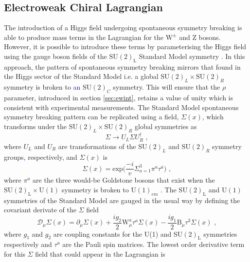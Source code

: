 \subsection{Electroweak Chiral Lagrangian}
\label{sec:ewchiral}
The introduction of a Higgs field undergoing spontaneous symmetry breaking is able to produce mass terms in the Lagrangian for the $\text{W}^{\pm}$ and Z bosons.  However, it is possible to introduce these terms by parameterising the Higgs field using the gauge boson fields of the $\text{SU}(2)_{\text{L}}$ Standard Model symmetry \cite{Herrero:1994tj}.  In this approach, the pattern of spontaneous symmetry breaking mirrors that found in the Higgs sector of the Standard Model i.e. a global $\text{SU}(2)_{L} \times \text{SU}(2)_{R}$ symmetry is broken to \textcolor{blue}{an} $\text{SU}(2)_{C}$ symmetry.  This will ensure that the $\rho$ parameter, introduced in section \ref{sec:ewint}, retains a value of unity which is consistent with experimental measurements.  The Standard Model spontaneous symmetry breaking pattern can be replicated using a field, $\Sigma(x)$, which transforms under the $\text{SU}(2)_{L} \times \text{SU}(2)_{R}$ global symmetries as
%
\begin{equation}
\Sigma \rightarrow U_{L} \Sigma U_{R}^{\dagger} \text{ ,}
\end{equation}
%
\noindent where $U_{L}$ and $U_{R}$ are transformations of the $\text{SU}(2)_{L}$ and $\text{SU}(2)_{R}$ symmetry groups\textcolor{blue}{,} respectively\textcolor{blue}{,} and $\Sigma(x)$ is
%
\begin{equation}
\Sigma(x) = \text{exp} \bigg(\frac{-i}{v} \Sigma^{3}_{a=1} \pi^{a}\tau^{a}\bigg)\text{ ,}
\end{equation}
%
\noindent where $\pi^{a}$ are the three would-be Goldstone bosons that exist when the $\text{SU}(2)_{\text{L}} \times \text{U}(1)$ symmetry is broken to $\text{U}(1)_{em}$ \cite{Longhitano:1980tm}.  The $\text{SU}(2)_{\text{L}}$ and $\text{U}(1)$ symmetries of the Standard Model are gauged in the usual way by defining the covariant derivate of the $\Sigma$ field
%
\begin{equation}
\mathcal{D}_{\mu} \Sigma(x) = \partial_{\mu} \Sigma(x) + \frac{ig_{2}}{2}\text{W}_{\mu}^{a}\tau^{a}\Sigma(x) - \frac{ig_{1}}{2}\text{B}_{\mu}\tau^{3}\Sigma(x) \text{ ,}
\end{equation}
%
\noindent where $g_{1}$ and $g_{2}$ are coupling constants for the U(1) and SU$(2)_\text{L}$ symmetries respectively and $\tau^{a}$ are the Pauli spin matrices.  The lowest order derivative term for this $\Sigma$ field that could appear in the Lagrangian is
